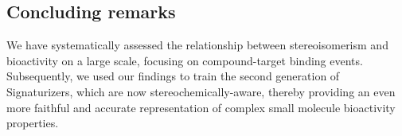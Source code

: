 \subsection{Concluding remarks}

We have systematically assessed the relationship between stereoisomerism and bioactivity on a large scale, focusing on compound-target binding events. Subsequently, we used our findings to train the second generation of Signaturizers, which are now stereochemically-aware, thereby providing an even more faithful and accurate representation of complex small molecule bioactivity properties.
